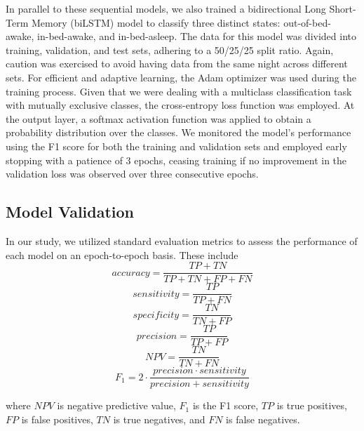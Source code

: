 \documentclass[
  10pt,
]{scrbook}
\begin{document}
In parallel to these sequential models, we also trained a bidirectional
Long Short-Term Memory (biLSTM) model to classify three distinct states:
out-of-bed-awake, in-bed-awake, and in-bed-asleep. The data for this
model was divided into training, validation, and test sets, adhering to
a 50/25/25 split ratio. Again, caution was exercised to avoid having
data from the same night across different sets. For efficient and
adaptive learning, the Adam optimizer was used during the training
process. Given that we were dealing with a multiclass classification
task with mutually exclusive classes, the cross-entropy loss function
was employed. At the output layer, a softmax activation function was
applied to obtain a probability distribution over the classes. We
monitored the model's performance using the F1 score for both the
training and validation sets and employed early stopping with a patience
of 3 epochs, ceasing training if no improvement in the validation loss
was observed over three consecutive epochs.

\hypertarget{model-validation}{%
\subsection{Model Validation}\label{model-validation}}

In our study, we utilized standard evaluation metrics to assess the
performance of each model on an epoch-to-epoch basis. These include
\[accuracy = \frac{TP+TN}{TP+TN+FP+FN}\]
\[sensitivity = \frac{TP}{TP+FN}\] \[specificity = \frac{TN}{TN+FP}\]
\[precision = \frac{TP}{TP+FP}\] \[NPV = \frac{TN}{TN + FN}\]
\[F_1 = 2 \cdot \frac{precision \cdot sensitivity}{precision + sensitivity}\]

where \(NPV\) is negative predictive value, \(F_1\) is the F1 score,
\(TP\) is true positives, \(FP\) is false positives, \(TN\) is true
negatives, and \(FN\) is false negatives.
\end{document}
